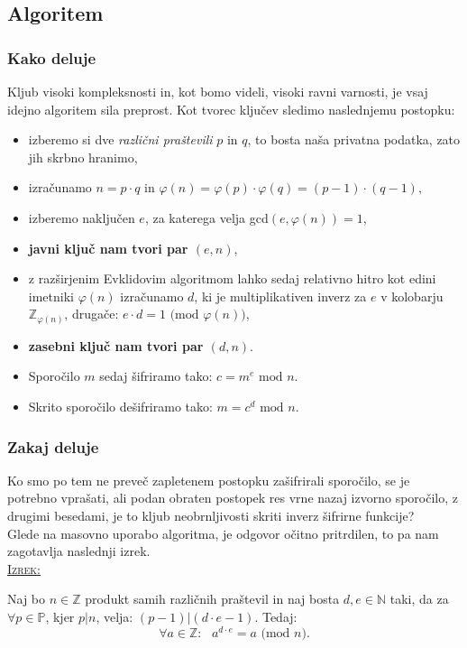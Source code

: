 \documentclass[a4paper, 12pt]{article} %
\newenvironment{matematika}[1]{
\textcolor{bostonuniversityred}{\underline{\textsc{#1:}}}
}{
}
\begin{document}
\subsection{Algoritem}

\subsubsection{Kako deluje}
Kljub visoki kompleksnosti in, kot bomo videli, visoki ravni varnosti, je vsaj idejno algoritem sila preprost. Kot tvorec ključev sledimo naslednjemu postopku:
\begin{itemize}[label=]
\item izberemo si dve \emph{različni praštevili} $p$ in $q$, to bosta naša privatna podatka, zato jih skrbno hranimo,
\item izračunamo $n=p \cdot q$ in $\varphi (n) = \varphi (p) \cdot \varphi (q) = (p-1) \cdot (q-1),$
\item izberemo naključen $e$, za katerega velja gcd$(e, \varphi (n)) = 1$,
\item \textbf{javni ključ nam tvori par $(e, n)$},
\item z razširjenim Evklidovim algoritmom lahko sedaj relativno hitro kot edini imetniki $\varphi (n)$ izračunamo $d$, ki je multiplikativen inverz za $e$ v kolobarju $\mathbb{Z}_{\varphi (n)}$, drugače: $e \cdot d = 1 \text{ (mod } \varphi (n))$,
\item \textbf{zasebni ključ nam tvori par $(d, n)$}.
\item Sporočilo $m$ sedaj šifriramo tako: $c = m^e \text{ mod } n$.
\item Skrito sporočilo dešifriramo tako: $m = c^d \text{ mod } n$.
\end{itemize}

\subsubsection{Zakaj deluje}

Ko smo po tem ne preveč zapletenem postopku zašifrirali sporočilo, se je potrebno vprašati, ali podan obraten postopek res vrne nazaj izvorno sporočilo, z drugimi besedami, je to kljub neobrnljivosti skriti inverz šifrirne funkcije? \\
Glede na masovno uporabo algoritma, je odgovor očitno pritrdilen, to pa nam zagotavlja naslednji izrek. \\

\begin{matematika}{Izrek}
Naj bo $n \in \mathbb{Z}$ produkt samih različnih praštevil in naj bosta $d, e \in \mathbb{N}$ taki, da za $\forall p \in \mathbb{P}$, kjer $p|n$, velja: $(p-1)|(d \cdot e - 1)$. Tedaj:
\[
\forall a \in \mathbb{Z}: \text{ } a^{d \cdot e} = a \text{ (mod } n).
\]
\end{matematika}
\end{document}
